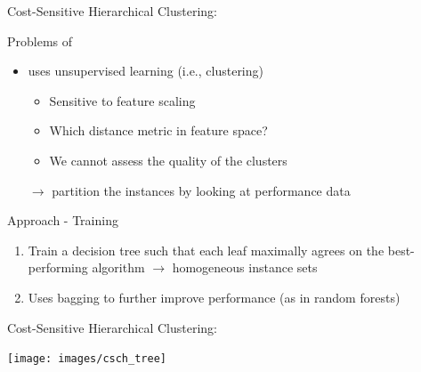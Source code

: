 \begin{frame}[c]{Cost-Sensitive Hierarchical Clustering: \cshc{}\\ }

\begin{block}{Problems of \isac{}}
\begin{itemize}
  \item \isac{} uses unsupervised learning (i.e., clustering)
  \begin{itemize}
    \item Sensitive to feature scaling
    \item Which distance metric in feature space?
    \item We cannot assess the quality of the clusters
  \end{itemize}
  \item[$\to$] \cshc{} partition the instances by looking at performance data
\end{itemize}
\end{block}


\begin{block}{Approach - Training}
\begin{enumerate}
  \item Train a decision tree such that each leaf maximally agrees on the best-performing algorithm $\to$ homogeneous instance sets
  \item Uses bagging to further improve performance (as in random forests)
\end{enumerate}
\end{block}


\end{frame}
\begin{frame}[c]{Cost-Sensitive Hierarchical Clustering: \cshc{}\\ }

\centering
\texttt{[image: images/csch\_tree]}

\end{frame}
